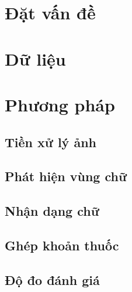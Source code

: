 \documentclass[11pt,a4paper]{article}
\begin{document}

\setcounter{tocdepth}{2}         %
\begingroup{}\setlength{\parskip}{0.2em}
\tableofcontents
\endgroup
\clearpage
{}            %

\section{Đặt vấn đề}\label{sec:intro}


\section{Dữ liệu}\label{sec:data}


\section{Phương pháp}\label{sec:method}

\subsection{Tiền xử lý ảnh}\label{sec:m-enhance}

\subsection{Phát hiện vùng chữ}\label{sec:m-detect}

\subsection{Nhận dạng chữ}\label{sec:m-recognize}

\subsection{Ghép khoản thuốc}\label{sec:m-assemble}

\subsection{Độ đo đánh giá}\label{sec:m-metrics}


\end{document}
